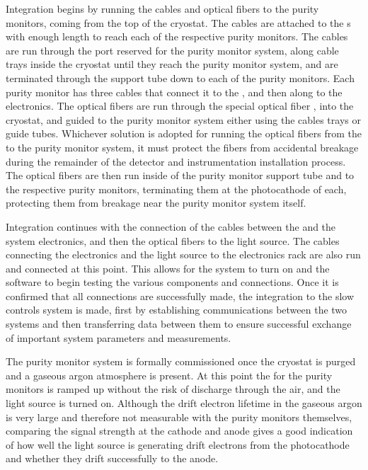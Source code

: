 Integration begins by running the  cables and optical fibers to the purity monitors, coming from the top of the cryostat.  The  cables are attached to the  \fdth{}s with enough length to reach each of the respective purity monitors.  The cables are run through the port reserved for the purity monitor system, along cable trays inside the cryostat until they reach the purity monitor system, and are terminated through the support tube down to each of the purity monitors.  Each purity monitor has three  cables that connect it to the \fdth, and then along to the  electronics.  The optical fibers are run through the special optical fiber \fdth, into the cryostat, and guided to the purity monitor system either using the cables trays or guide tubes.  Whichever solution is adopted for running the optical fibers from the \fdth to the purity monitor system, it must protect the fibers from accidental breakage during the remainder of the detector and instrumentation installation process.  The optical fibers are then run inside of the purity monitor support tube and to the respective purity monitors,  terminating them at the photocathode of each, protecting them from breakage near the purity monitor system itself.

Integration  continues with the connection of the  cables between the \fdth and the system  electronics, and then the optical fibers to the light source.  The cables connecting the  electronics and the light source to the electronics rack are also run and connected at this point.  This allows for the system to turn on and the software to begin testing the various components and connections.  Once it is confirmed that all connections are successfully made, the integration to the slow controls system is made, first by establishing communications between the two systems and then transferring data between them to ensure successful exchange of important system parameters and measurements.  

The purity monitor system is formally commissioned %
once the cryostat is purged and a gaseous argon atmosphere is present.  At this point the  for the purity monitors is ramped up without the risk of discharge through the air, and the light source is turned on.  Although the drift electron lifetime in the gaseous argon is very large and therefore not measurable with the purity monitors themselves, comparing the signal strength at the cathode and anode gives a good indication of how well the light source is generating drift electrons from the photocathode and whether they drift successfully to the anode. %


